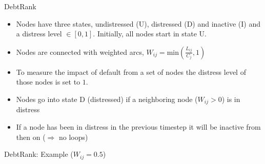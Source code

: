 \documentclass[]{beamer}
\def\SAMPLESONE{200}
\def\SAMPLESONE{20}
\begin{document}
\begin{frame}{DebtRank}
	\begin{itemize}[<+-| alert@+>]
		\item Nodes have three states, undistressed (U), distressed (D) and inactive (I) and a distress level $\in [0,1]$. Initially, all nodes start in state U.
		\item Nodes are connected with weighted arcs, $W_{ij} = \mathrm{min}\left(\frac{L_{ij}}{C_j},1\right)$
		\item To measure the impact of default from a set of nodes the distress level of those nodes is set to $1$.
		\item Nodes go into state D (distressed) if a neighboring node ($W_{ij} > 0$) is in distress
		\item If a node has been in distress in the previous timestep it will be inactive from then on ($\Rightarrow$ no loops)
	\end{itemize}	
\end{frame}
\begin{frame}{DebtRank: Example ($W_{ij} = 0.5$)}
		
\end{frame}

\begin{frame}%
	
\end{frame}





			
		
\end{document}
